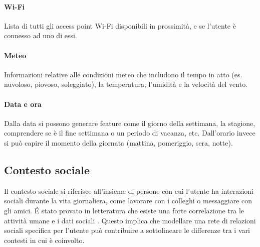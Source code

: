 \documentclass[12pt,italian]{report}
\begin{document}
\paragraph{Wi-Fi} Lista di tutti gli access point Wi-Fi disponibili in prossimità, e se l'utente è connesso ad uno di essi.

\paragraph{Meteo} Informazioni relative alle condizioni meteo che includono il tempo in atto (es. nuvoloso, piovoso, soleggiato), la temperatura, l'umidità e la velocità del vento.

\paragraph{Data e ora} Dalla data si possono generare feature come il giorno della settimana, la stagione, comprendere se è il fine settimana o un periodo di vacanza, etc. Dall'orario invece si può capire il momento della giornata (mattina, pomeriggio, sera, notte).

\subsection{Contesto sociale} \label{subsec:social-context}
Il contesto sociale si riferisce all'insieme di persone con cui l'utente ha interazioni sociali durante la vita giornaliera, come lavorare con i colleghi o messaggiare con gli amici. \'E stato provato in letteratura che esiste una forte correlazione tra le attività umane e i dati sociali \cite{ego-net}. Questo implica che modellare una rete di relazioni sociali specifica per l'utente  può contribuire a sottolineare le differenze tra i vari contesti in cui è coinvolto.
\end{document}
